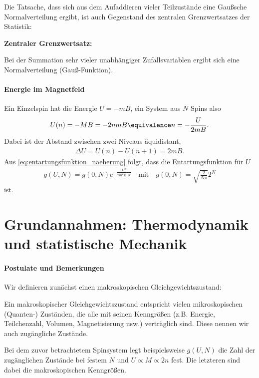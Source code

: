 Die Tatsache, dass sich aus dem Aufaddieren vieler Teilzustände eine Gaußsche Normalverteilung ergibt, ist auch Gegenstand des zentralen Grenzwertsatzes der Statistik:
\begin{formal}
    \textbf{Zentraler Grenzwertsatz:}

    Bei der Summation sehr vieler unabhängiger Zufallsvariablen ergibt sich eine Normalverteilung (Gauß-Funktion).
\end{formal}


\paragraph*{Energie im Magnetfeld}

Ein Einzelspin hat die Energie $U=-mB$, ein System aus $N$ Spins also
\begin{align*}
    U(n)=-MB = -2nmB \equivalence n = -\frac{U}{2mB}. 
\end{align*}
Dabei ist der Abstand zwischen zwei Niveaus äquidistant,
\begin{align*}
    \Delta U = U(n) - U(n+1) = 2mB.
\end{align*}
Aus \eqref{eq:entartungsfunktion_naeherung} folgt, dass die Entartungsfunktion für $U$
\begin{align*}
    g(U,N) = g(0,N) e^{-\frac{U^2}{2m^2B^2N}} \quad \mathrm{mit}\quad g(0,N) = \sqrt{\frac{2}{N\pi }} 2^N
\end{align*}
ist.


\section{Grundannahmen: Thermodynamik und statistische Mechanik}

\paragraph*{Postulate und Bemerkungen}

Wir definieren zunächst einen makroskopischen Gleichgewichtszustand:
\begin{formal}
    Ein makroskopischer Gleichgewichtszustand entspricht vielen mikroskopischen (Quanten-) Zuständen, die alle mit seinen Kenngrößen (z.B. Energie, Teilchenzahl, Volumen, Magnetisierung usw.) verträglich sind. Diese nennen wir auch zugängliche Zustände.
\end{formal}

Bei dem zuvor betrachtetem Spinsystem legt beispielsweise $g(U,N)$ die Zahl der zugänglichen Zustände bei festem $N$ und $U\propto M \propto 2n$ fest. Die letzteren sind dabei die makroskopischen Kenngrößen.

